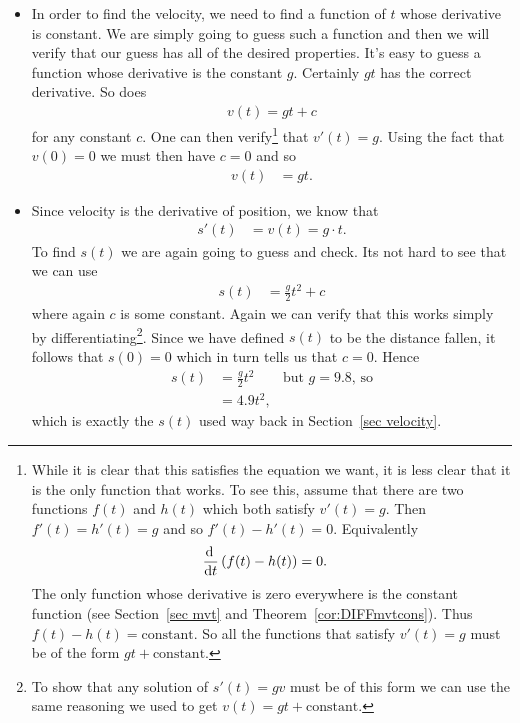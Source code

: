 \begin{eg}
\begin{itemize}
\item In order to find the velocity, we need to find a function of $t$ whose derivative
is constant. We are simply going to guess such a function and then we will verify that our
guess has all of the desired properties. It's easy to guess a function whose derivative is
the constant $g$.  Certainly $gt$ has the correct derivative. So does
\begin{align*}
    v(t) = gt + c
\end{align*}
for any constant $c$. One can then verify\footnote{While it is clear that this satisfies
the equation we want, it is less clear that it is the only function that
works. To see this, assume that there are two functions $f(t)$ and $h(t)$ which both
satisfy $v'(t)=g$. Then $f'(t)=h'(t) = g$ and so $f'(t)-h'(t) = 0$. Equivalently
\begin{align*}
  \diff{}{t}\left( f(t)-h(t) \right) &= 0.
\end{align*}
The only function whose derivative is zero everywhere is the constant function (see
Section~\ref{sec mvt} and Theorem~\ref{cor:DIFFmvtcons}). Thus $f(t)-h(t) =
\text{constant}$. So all the functions that satisfy $v'(t)=g$ must be of the form $gt +
\text{constant}$.
} that $v'(t)=g$. Using the fact that $v(0)=0$ we must then have $c=0$ and so
\begin{align*}
  v(t) &= gt.
\end{align*}

\item Since velocity is the derivative of position, we know that
\begin{align*}
  s'(t) &= v(t) = g \cdot t.
\end{align*}
To find $s(t)$ we are again going to guess and check. Its not hard to see that we can use
\begin{align*}
  s(t) &= \frac{g}{2} t^2 + c
\end{align*}
where again $c$ is some constant. Again we can verify that this works
simply by differentiating\footnote{To show that any solution of $s'(t)=gv$
must be of this form we can use the same reasoning we used to get $v(t) = gt +
\text{constant}$.}. Since we have defined $s(t)$ to be the distance fallen, it follows
that $s(0)=0$ which in turn tells us that $c = 0$. Hence
\begin{align*}
  s(t) &= \frac{g}{2} t^2 & \text{but $g=9.8$, so}\\
  &= 4.9 t^2,
\end{align*}
which is exactly the $s(t)$ used way back in Section~\ref{sec velocity}.
\end{itemize}


\end{eg}

